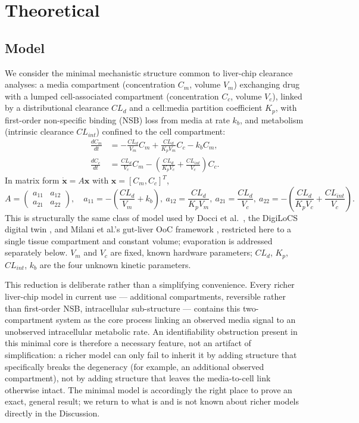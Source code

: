 \section*{Theoretical}

\subsection*{Model}

We consider the minimal mechanistic structure common to liver-chip clearance analyses: a media compartment (concentration $C_m$, volume $V_m$) exchanging drug with a lumped cell-associated compartment (concentration $C_c$, volume $V_c$), linked by a distributional clearance $CL_d$ and a cell:media partition coefficient $K_p$, with first-order non-specific binding (NSB) loss from media at rate $k_b$, and metabolism (intrinsic clearance $CL_{int}$) confined to the cell compartment:
\begin{align}
\frac{dC_m}{dt} &= -\frac{CL_d}{V_m}C_m + \frac{CL_d}{K_p V_m}C_c - k_b C_m, \label{eq:cm}\\
\frac{dC_c}{dt} &= \frac{CL_d}{V_c}C_m - \left(\frac{CL_d}{K_p V_c} + \frac{CL_{int}}{V_c}\right)C_c. \label{eq:cc}
\end{align}
In matrix form $\dot{\mathbf{x}} = A\mathbf{x}$ with $\mathbf{x} = [C_m, C_c]^T$,
\[
A = \begin{pmatrix} a_{11} & a_{12} \\ a_{21} & a_{22} \end{pmatrix}, \quad
a_{11} = -\left(\frac{CL_d}{V_m} + k_b\right),\ a_{12} = \frac{CL_d}{K_p V_m},\ a_{21} = \frac{CL_d}{V_c},\ a_{22} = -\left(\frac{CL_d}{K_p V_c} + \frac{CL_{int}}{V_c}\right).
\]
This is structurally the same class of model used by Docci et al.\ \citep{docci2022}, the DigiLoCS digital twin \citep{aravindakshan2025}, and Milani et al.'s gut-liver OoC framework \citep{milani2022,milani2024}, restricted here to a single tissue compartment and constant volume; evaporation is addressed separately below. $V_m$ and $V_c$ are fixed, known hardware parameters; $CL_d$, $K_p$, $CL_{int}$, $k_b$ are the four unknown kinetic parameters.

This reduction is deliberate rather than a simplifying convenience. Every richer liver-chip model in current use --- additional compartments, reversible rather than first-order NSB, intracellular sub-structure --- contains this two-compartment system as the core process linking an observed media signal to an unobserved intracellular metabolic rate. An identifiability obstruction present in this minimal core is therefore a necessary feature, not an artifact of simplification: a richer model can only fail to inherit it by adding structure that specifically breaks the degeneracy (for example, an additional observed compartment), not by adding structure that leaves the media-to-cell link otherwise intact. The minimal model is accordingly the right place to prove an exact, general result; we return to what is and is not known about richer models directly in the Discussion.

